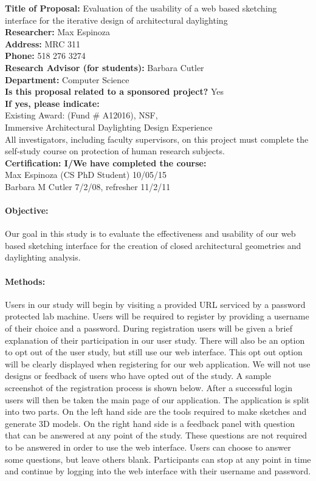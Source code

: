 \documentclass[12pt]{article}
\begin{document}
\noindent
{\bf Title of Proposal:} Evaluation of the usability of a web based 
sketching interface for the iterative design of architectural daylighting \\
{\bf Researcher:}   Max Espinoza\\
{\bf Address:}  MRC 311\\
{\bf Phone:} 518 276 3274\\ 
{\bf Research Advisor (for students):}  Barbara Cutler \\
{\bf Department:}  Computer Science \\
{\bf Is this proposal related to a sponsored project?}  Yes \\
{\bf If yes,  please indicate:}  \\
Existing Award: (Fund \# A12016), NSF, \\
Immersive Architectural Daylighting Design Experience \\

\noindent
All investigators, including faculty supervisors, on this project must
complete the self-study course on protection of human research
subjects. \\
{\bf Certification:  I/We have completed the course:} \\
Max Espinoza (CS PhD Student) 10/05/15 \\ 
Barbara M Cutler 7/2/08, refresher 11/2/11 %

\paragraph{Objective:}
%
Our goal in this study is to evaluate the effectiveness and usability of 
our web based sketching interface for the creation of closed architectural 
geometries and daylighting analysis.

\paragraph{Methods:}
%
Users in our study will begin by visiting a provided URL serviced by a password protected lab machine.
Users will be required to register by providing a username of their choice and a password.
During registration users will be given a brief explanation of their participation in our
user study. There will also be an option to opt out of the user study, but still use our web interface. 
This opt out option will be clearly displayed when registering for our web application.
We will not use designs or feedback of users who have opted out of the study.
A sample screenshot of the registration process is shown below.
After a successful login users will then be taken the main page of our application.
The application is split into two parts. On the left hand side are the tools required to
make sketches and generate 3D models. On the right hand side is a feedback panel with question 
that can be answered at any point of the study. These questions are not required to be answered in order
to use the web interface. Users can choose to answer some questions, but leave others blank.
Participants can stop at any point in time and continue by logging into the web interface
with their username and password.\\
\end{document}
